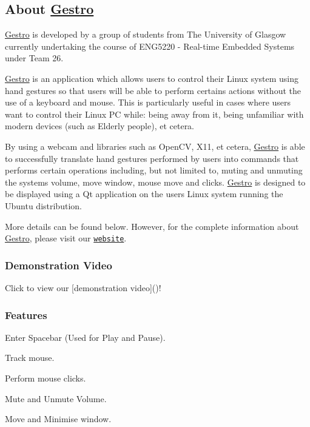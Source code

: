 \subsection*{About \hyperlink{namespace_gestro}{Gestro}}

\hyperlink{namespace_gestro}{Gestro} is developed by a group of students from The University of Glasgow currently undertaking the course of E\+N\+G5220 -\/ Real-\/time Embedded Systems under Team 26.

\hyperlink{namespace_gestro}{Gestro} is an application which allows users to control their Linux system using hand gestures so that users will be able to perform certains actions without the use of a keyboard and mouse. This is particularly useful in cases where users want to control their Linux PC while\+: being away from it, being unfamiliar with modern devices (such as Elderly people), et cetera.

By using a webcam and libraries such as Open\+CV, X11, et cetera, \hyperlink{namespace_gestro}{Gestro} is able to successfully translate hand gestures performed by users into commands that performs certain operations including, but not limited to, muting and unmuting the system\textquotesingle{}s volume, move window, mouse move and clicks. \hyperlink{namespace_gestro}{Gestro} is designed to be displayed using a Qt application on the users\textquotesingle{} Linux system running the Ubuntu distribution.

More details can be found below. However, for the complete information about \hyperlink{namespace_gestro}{Gestro}, please visit our \href{https://randomguy-coder.github.io/Gestro/}{\tt website}.

\subsubsection*{Demonstration Video}

Click to view our \mbox{[}demonstration video\mbox{]}()!

  

\subsubsection*{Features}


\begin{DoxyItemize}
\item Enter Spacebar (Used for Play and Pause).
\item Track mouse.
\item Perform mouse clicks.
\item Mute and Unmute Volume.
\item Move and Minimise window.
\end{DoxyItemize}

